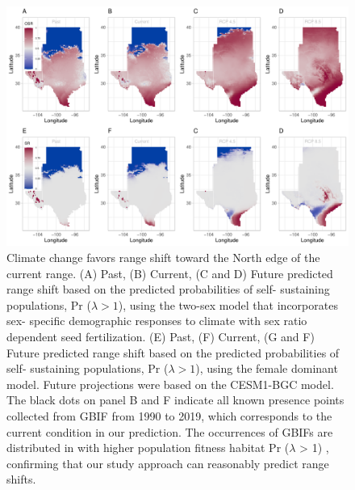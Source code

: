 \documentclass[12pt]{article}
\begin{document}
\begin{figure}[H]
  \begin{center}
    \includegraphics[width=0.99\linewidth]{Figures/Fig_geo_sr_ces.pdf}
  \caption{Climate change favors range shift toward the North edge of the current range.
  (A) Past, (B) Current, (C and D) Future predicted range shift based on the predicted probabilities of self- sustaining populations, Pr ($\lambda > 1$), using the two-sex model that incorporates sex- specific demographic responses to climate with sex ratio dependent seed fertilization.
  (E) Past, (F) Current, (G and F) Future  predicted range shift based on the predicted probabilities of self- sustaining populations, Pr ($\lambda > 1$), using the female dominant model.
  Future projections were based on the CESM1-BGC model.
  The black dots on panel B and F indicate all known presence points collected from GBIF from 1990 to 2019, which corresponds to the current condition in our prediction. 
  The occurrences of GBIFs are distributed in with higher population fitness habitat Pr ($\lambda$ > 1) , confirming that our study approach can reasonably predict range shifts. }
  \label{Sup:srprojces}
  \end{center}
\end{figure}
\end{document}
